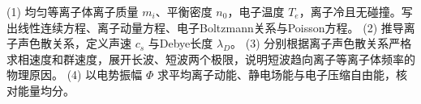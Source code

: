 (1) 均匀等离子体离子质量 \(m_i\)、平衡密度 \(n_0\)，电子温度 \(T_e\)，离子冷且无碰撞。写出线性连续方程、离子动量方程、电子Boltzmann关系与Poisson方程。
(2) 推导离子声色散关系，定义声速 \(c_s\) 与Debye长度 \(\lambda_D\)。
(3) 分别根据离子声色散关系严格求相速度和群速度，展开长波、短波两个极限，说明短波趋向离子等离子体频率的物理原因。
(4) 以电势振幅 \(\Phi\) 求平均离子动能、静电场能与电子压缩自由能，核对能量均分。
